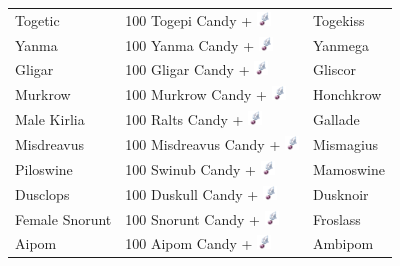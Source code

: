 \begin{table}[ht]
\begin{center}
\begin{tabular}{lll}
    Togetic & 100 Togepi Candy + \includegraphics[width=1em,height=1em]{images/sinnohstone.png} & Togekiss	\\
    Yanma & 100 Yanma Candy + \includegraphics[width=1em,height=1em]{images/sinnohstone.png} & Yanmega	\\
    Gligar & 100 Gligar Candy + \includegraphics[width=1em,height=1em]{images/sinnohstone.png} & Gliscor	\\
    Murkrow & 100 Murkrow Candy + \includegraphics[width=1em,height=1em]{images/sinnohstone.png} & Honchkrow	\\
    Male Kirlia & 100 Ralts Candy + \includegraphics[width=1em,height=1em]{images/sinnohstone.png} & Gallade	\\
    Misdreavus & 100 Misdreavus Candy + \includegraphics[width=1em,height=1em]{images/sinnohstone.png} & Mismagius	\\
    Piloswine & 100 Swinub Candy + \includegraphics[width=1em,height=1em]{images/sinnohstone.png} & Mamoswine	\\
    Dusclops & 100 Duskull Candy + \includegraphics[width=1em,height=1em]{images/sinnohstone.png} & Dusknoir	\\
    Female Snorunt & 100 Snorunt Candy + \includegraphics[width=1em,height=1em]{images/sinnohstone.png} & Froslass	\\
    Aipom & 100 Aipom Candy + \includegraphics[width=1em,height=1em]{images/sinnohstone.png} & Ambipom	\\

\end{tabular}
\end{center}
\end{table}
